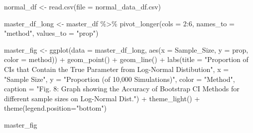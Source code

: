 \documentclass[12pt]{article}
\newenvironment{Shaded}{\begin{snugshade}}{\end{snugshade}}
\newcommand{\AttributeTok}[1]{\textcolor[rgb]{0.77,0.63,0.00}{#1}}
\newcommand{\DecValTok}[1]{\textcolor[rgb]{0.00,0.00,0.81}{#1}}
\newcommand{\FunctionTok}[1]{\textcolor[rgb]{0.00,0.00,0.00}{#1}}
\newcommand{\NormalTok}[1]{#1}
\newcommand{\OtherTok}[1]{\textcolor[rgb]{0.56,0.35,0.01}{#1}}
\newcommand{\SpecialCharTok}[1]{\textcolor[rgb]{0.00,0.00,0.00}{#1}}
\newcommand{\StringTok}[1]{\textcolor[rgb]{0.31,0.60,0.02}{#1}}
\begin{document}
\begin{Shaded}
\begin{Highlighting}[]
\NormalTok{normal\_df }\OtherTok{\textless{}{-}} \FunctionTok{read.csv}\NormalTok{(}\AttributeTok{file =} \StringTok{\textquotesingle{}normal\_data\_df.csv\textquotesingle{}}\NormalTok{)}

\NormalTok{master\_df\_long }\OtherTok{\textless{}{-}}\NormalTok{ master\_df }\SpecialCharTok{\%\textgreater{}\%}
  \FunctionTok{pivot\_longer}\NormalTok{(}\AttributeTok{cols =} \DecValTok{2}\SpecialCharTok{:}\DecValTok{6}\NormalTok{, }\AttributeTok{names\_to =} \StringTok{"method"}\NormalTok{, }\AttributeTok{values\_to =} \StringTok{"prop"}\NormalTok{) }
    
\NormalTok{master\_fig }\OtherTok{\textless{}{-}} \FunctionTok{ggplot}\NormalTok{(}\AttributeTok{data =}\NormalTok{ master\_df\_long, }
                    \FunctionTok{aes}\NormalTok{(}\AttributeTok{x =}\NormalTok{ Sample\_Size, }\AttributeTok{y =}\NormalTok{ prop, }\AttributeTok{color =}\NormalTok{ method)) }\SpecialCharTok{+} 
  \FunctionTok{geom\_point}\NormalTok{() }\SpecialCharTok{+} \FunctionTok{geom\_line}\NormalTok{() }\SpecialCharTok{+} 
  \FunctionTok{labs}\NormalTok{(}\AttributeTok{title =} \StringTok{"Proportion of CIs that Contain the True Parameter from Log{-}Normal}
\StringTok{       Distibution"}\NormalTok{, }\AttributeTok{x =} \StringTok{"Sample Size"}\NormalTok{, }
       \AttributeTok{y =} \StringTok{"Proportion (of 10,000 Simulations)"}\NormalTok{, }\AttributeTok{color =} \StringTok{"Method"}\NormalTok{,}
       \AttributeTok{caption =} \StringTok{"Fig. 8: Graph showing the Accuracy of Bootstrap CI Methods for different sample sizes on Log{-}Normal Dist."}\NormalTok{) }\SpecialCharTok{+}
  \FunctionTok{theme\_light}\NormalTok{() }\SpecialCharTok{+}
  \FunctionTok{theme}\NormalTok{(}\AttributeTok{legend.position=}\StringTok{"bottom"}\NormalTok{)}

\NormalTok{master\_fig}
\end{Highlighting}
\end{Shaded}




\end{document}

